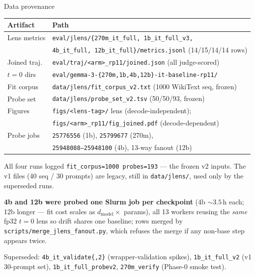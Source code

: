 \documentclass[aspectratio=169,10pt]{beamer}
\newcommand{\good}[1]{\textcolor{up}{#1}}
\begin{document}
\begin{frame}{Data provenance}
  \small
  \begin{tabular}{ll}
    \toprule
    Artifact & Path \\
    \midrule
    Lens metrics & \texttt{eval/jlens/\{270m\_it\_full, 1b\_it\_full\_v3,} \\
                 & \texttt{4b\_it\_full, 12b\_it\_full\}/metrics.jsonl} (14/15/14/14 rows) \\
    Joined traj. & \texttt{eval/traj/<arm>\_rp11/joined.json} \good{(all judge-scored)} \\
    $t{=}0$ dirs & \texttt{eval/gemma-3-\{270m,1b,4b,12b\}-it-baseline-rp11/} \\
    Fit corpus   & \texttt{data/jlens/fit\_corpus\_v2.txt} (1000 WikiText seq, frozen) \\
    Probe set    & \texttt{data/jlens/probe\_set\_v2.tsv} (50/50/93, frozen) \\
    Figures      & \texttt{figs/<lens-tag>/} lens (decode-independent); \\
                 & \texttt{figs/<arm>\_rp11/fig\_joined.pdf} (decode-dependent) \\
    Probe jobs   & \texttt{25776556} (1b), \texttt{25799677} (270m), \\
                 & \texttt{25948088--25948100} (4b), 13-way fanout (12b) \\
    \bottomrule
  \end{tabular}

  \vspace{0.4em}
  {\scriptsize All four runs logged \texttt{fit\_corpus=1000 probes=193} --- the
  frozen v2 inputs. The v1 files (40 seq / 30 prompts) are legacy, still in
  \texttt{data/jlens/}, used only by the superseded runs.

  \smallskip
  \textbf{4b and 12b were probed one Slurm job per checkpoint} (4b ${\sim}3.5$\,h
  each; 12b longer --- fit cost scales as $d_\text{model} \times$ params), all 13
  workers reusing the \emph{same} fp32 $t{=}0$ lens so drift shares one baseline;
  rows merged by \texttt{scripts/merge\_jlens\_fanout.py}, which refuses the
  merge if any non-base step appears twice.

  \smallskip
  Superseded: \texttt{4b\_it\_validate\{,2\}} (wrapper-validation spikes),
  \texttt{1b\_it\_full\_v2} (v1 30-prompt set), \texttt{1b\_it\_full\_probev2},
  \texttt{270m\_verify} (Phase-0 smoke test).}
\end{frame}
\end{document}
